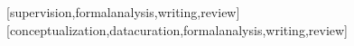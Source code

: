 \documentclass[english]{textolivre}
\begin{document}
\begin{contributors}
[supervision,formalanalysis,writing,review]
[conceptualization,datacuration,formalanalysis,writing,review]
\end{contributors}
\end{document}
